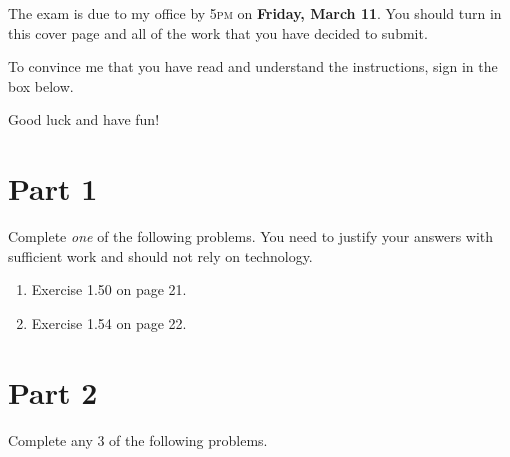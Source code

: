 \documentclass[11pt]{article}
\theoremstyle{definition}
\begin{document}
The exam is due to my office by 5\textsc{pm} on \textbf{Friday, March 11}.  You should turn in this cover page and all of the work that you have decided to submit.

\bigskip

To convince me that you have read and understand the instructions, sign in the box below.

\bigskip


\bigskip

Good luck and have fun!

\newpage

\section*{Part 1}
Complete \emph{one} of the following problems.  You need to justify your answers with sufficient work and should not rely on technology.

\begin{enumerate}

\item Exercise 1.50 on page 21.

\item Exercise 1.54 on page 22.

\end{enumerate}

\section*{Part 2}

Complete any 3 of the following problems.
\end{document}
